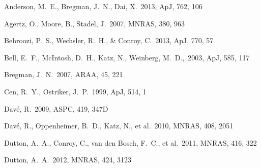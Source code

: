 \documentclass[useAMS,usenatbib]{mn2e}
\def \apj {ApJ}
\def \mnras {MNRAS}
\def \apjs {ApJS}
\begin{document}
\begin{thebibliography}{}


 Anderson, M.~E., Bregman, J.~N., Dai, X.\ 2013, \apj, 762, 106

 Agertz, O., Moore, B., Stadel, J.\ 2007, \mnras, 380, 963


 Behroozi, P.~S.,
  Wechsler, R.~H., \& Conroy, C.\ 2013, \apj, 770, 57

 Bell, E.~F., McIntosh, D.~H., Katz, N., Weinberg, M.~D.,\ 2003, \apj, 585, 117


Bregman, J.~N.\ 2007, ARAA, 45, 221


Cen, R.~Y., Ostriker, J.~P.\ 1999, \apj, 514, 1




 Dav{\'e}, R.\ 2009, ASPC, 419, 347D

 Dav{\'e}, R., Oppenheimer, B.~D., Katz, N., et al.\ 2010, \mnras, 408, 2051

 Dutton, A.~A., Conroy, 
  C., van den Bosch, F.~C., et al.\ 2011, \mnras, 416, 322
  
 Dutton, A.~A.\ 2012,
  \mnras, 424, 3123
  

\end{thebibliography}
\end{document}
